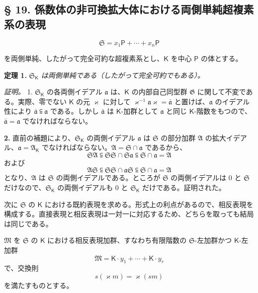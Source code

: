 \subsection*{§ 19. 係数体の非可換拡大体における両側単純超複素系の表現}\label{darstellungen-zweiseitig-einfacher-hyperkomplexer-systeme-in-nichtkommutativen-erweiterungskoerpern-ihrer-koeffizientenkoerper}

\[
\mathfrak S=x_1\mathsf P+\cdots+x_n\mathsf P
\]

を両側単純、したがって完全可約な超複素系とし、$\mathsf K$ を中心 $\mathsf P$ の体とする。

\textbf{定理 1.} \emph{$\mathfrak S_{\mathsf K}$ は両側単純である（したがって完全可約でもある）。}

\emph{証明。} 1. $\mathfrak S_{\mathsf K}$ の各両側イデアル $\mathfrak a$ は、$\mathsf K$ の内部自己同型群 $\mathfrak G$ に関して不変である。実際、零でない $\mathsf K$ の元 $\varkappa$ に対して $\varkappa^{-1}\mathfrak a\varkappa=\bar{\mathfrak a}$ と置けば、$\mathfrak a$ のイデアル性により $\bar{\mathfrak a}\subseteqq\mathfrak a$ である。しかし $\bar{\mathfrak a}$ は $\mathsf K$-加群として $\mathfrak a$ と同じ $\mathsf K$-階数をもつので、$\bar{\mathfrak a}=\mathfrak a$ でなければならない。

\textbf{2.} 直前の補題により、$\mathfrak S_{\mathsf K}$ の両側イデアル $\mathfrak a$ は $\mathfrak S$ の部分加群 $\mathfrak A$ の拡大イデアル、$\mathfrak a=\mathfrak A_{\mathsf K}$ でなければならない。$\mathfrak A=\mathfrak S\cap\mathfrak a$ であるから、
\[
\mathfrak S\mathfrak A\subseteqq\mathfrak S\mathfrak S\cap\mathfrak S\mathfrak a\subseteqq\mathfrak S\cap\mathfrak a=\mathfrak A
\]
および
\[
\mathfrak A\mathfrak S\subseteqq\mathfrak S\mathfrak S\cap\mathfrak a\mathfrak S\subseteqq\mathfrak S\cap\mathfrak a=\mathfrak A
\]
となり、$\mathfrak A$ は $\mathfrak S$ の両側イデアルである。ところが $\mathfrak S$ の両側イデアルは $0$ と $\mathfrak S$ だけなので、$\mathfrak S_{\mathsf K}$ の両側イデアルも $0$ と $\mathfrak S_{\mathsf K}$ だけである。証明された。

次に $\mathfrak S$ の $\mathsf K$ における既約表現を求める。形式上の利点があるので、相反表現を構成する。直接表現と相反表現は一対一に対応するため、どちらを取っても結局は同じである。

$\mathfrak M$ を $\mathfrak S$ の $\mathsf K$ における相反表現加群、すなわち有限階数の $\mathfrak S$-左加群かつ $\mathsf K$-左加群
\[
\mathfrak M=\mathsf K\cdot y_1+\cdots+\mathsf K\cdot y_r
\]
で、交換則
\[
s(\varkappa m)=\varkappa (sm)
\]
を満たすものとする。

